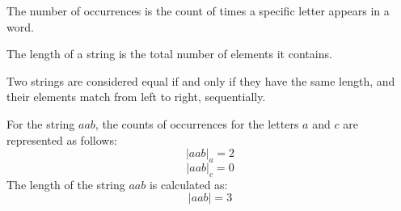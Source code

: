 \begin{definition}
    The number of occurrences is the count of times a specific letter appears in a word.
\end{definition}  
\begin{definition}
    The length of a string is the total number of elements it contains.
\end{definition}
\begin{definition}
    Two strings are considered equal if and only if they have the same length, and their elements match from left to right, sequentially.
\end{definition}
\begin{example}
    For the string $aab$, the counts of occurrences for the letters $a$ and $c$ are represented as follows:
    \[{\left\lvert aab \right\rvert}_a = 2\]
    \[{\left\lvert aab \right\rvert}_c = 0\]
    The length of the string $aab$ is calculated as:
    \[\left\lvert aab \right\rvert = 3\]
\end{example}